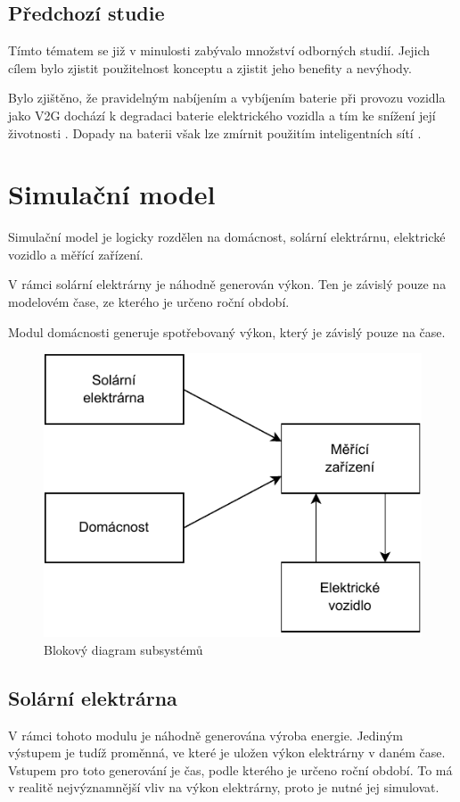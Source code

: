 \documentclass[12pt,a4paper]{article}
\begin{document}
\subsection{Předchozí studie}
Tímto tématem se již v minulosti zabývalo množství odborných studií. Jejich cílem bylo zjistit použitelnost konceptu a zjistit jeho benefity a nevýhody. 

Bylo zjištěno, že pravidelným nabíjením a vybíjením baterie při provozu vozidla jako V2G dochází k degradaci baterie elektrického vozidla a tím ke snížení její životnosti 
\cite{Shirazi-2018}.
Dopady na baterii však lze zmírnit použitím inteligentních sítí 
\cite{University-of-Warwick-2017}.

\section{Simulační model}
Simulační model je logicky rozdělen na domácnost, solární elektrárnu, elektrické vozidlo a měřící zařízení.

V rámci solární elektrárny je náhodně generován výkon.
Ten je závislý pouze na modelovém čase, ze kterého je určeno roční období.

Modul domácnosti generuje spotřebovaný výkon, který je závislý pouze na čase.

\begin{figure}[H]
\begin{center}
\includegraphics[width=0.6\linewidth]{img/diagram.pdf}
\end{center}
\caption{Blokový diagram subsystémů}
\label{fig:solar_month}
\end{figure}

\subsection{Solární elektrárna}
V rámci tohoto modulu je náhodně generována výroba energie.
Jediným výstupem je tudíž proměnná, ve které je uložen výkon elektrárny v daném čase.
Vstupem pro toto generování je čas, podle kterého je určeno roční období.
To má v realitě nejvýznamnější vliv na výkon elektrárny, proto je nutné jej simulovat.
\end{document}
